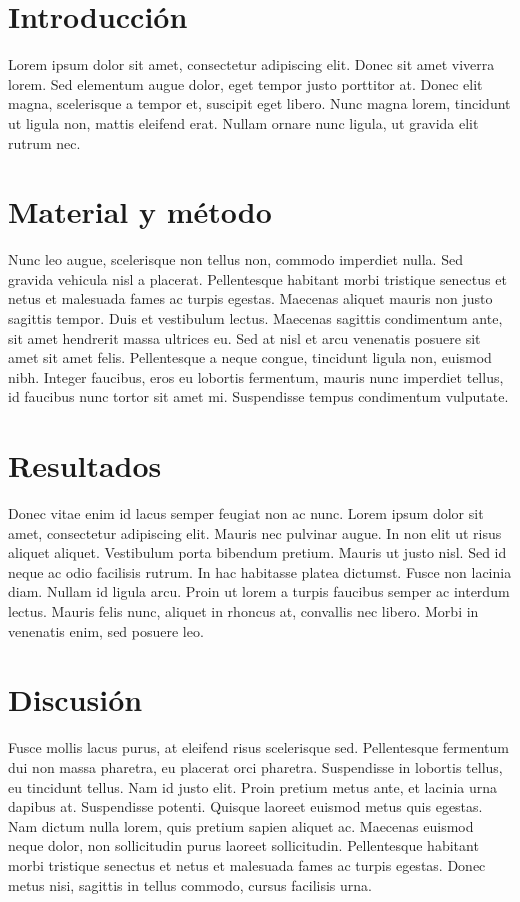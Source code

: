 \documentclass[a4paper, 10pt]{article}
\begin{document}
	\begin{multicols}{2}
		\section{Introducción}
		Lorem ipsum dolor sit amet, consectetur adipiscing elit. Donec sit amet viverra lorem. Sed elementum augue dolor, eget tempor justo porttitor at. Donec elit magna, scelerisque a tempor et, suscipit eget libero. Nunc magna lorem, tincidunt ut ligula non, mattis eleifend erat. Nullam ornare nunc ligula, ut gravida elit rutrum nec. 
		
		\section{Material y método}
		Nunc leo augue, scelerisque non tellus non, commodo imperdiet nulla. Sed gravida vehicula nisl a placerat. Pellentesque habitant morbi tristique senectus et netus et malesuada fames ac turpis egestas. Maecenas aliquet mauris non justo sagittis tempor. Duis et vestibulum lectus. Maecenas sagittis condimentum ante, sit amet hendrerit massa ultrices eu. Sed at nisl et arcu venenatis posuere sit amet sit amet felis. Pellentesque a neque congue, tincidunt ligula non, euismod nibh. Integer faucibus, eros eu lobortis fermentum, mauris nunc imperdiet tellus, id faucibus nunc tortor sit amet mi. Suspendisse tempus condimentum vulputate.
		
		\section{Resultados}
		Donec vitae enim id lacus semper feugiat non ac nunc. Lorem ipsum dolor sit amet, consectetur adipiscing elit. Mauris nec pulvinar augue. In non elit ut risus aliquet aliquet. Vestibulum porta bibendum pretium. Mauris ut justo nisl. Sed id neque ac odio facilisis rutrum. In hac habitasse platea dictumst. Fusce non lacinia diam. Nullam id ligula arcu. Proin ut lorem a turpis faucibus semper ac interdum lectus. Mauris felis nunc, aliquet in rhoncus at, convallis nec libero. Morbi in venenatis enim, sed posuere leo.
		
		\section{Discusión}
		Fusce mollis lacus purus, at eleifend risus scelerisque sed. Pellentesque fermentum dui non massa pharetra, eu placerat orci pharetra. Suspendisse in lobortis tellus, eu tincidunt tellus. Nam id justo elit. Proin pretium metus ante, et lacinia urna dapibus at. Suspendisse potenti. Quisque laoreet euismod metus quis egestas. Nam dictum nulla lorem, quis pretium sapien aliquet ac. Maecenas euismod neque dolor, non sollicitudin purus laoreet sollicitudin. Pellentesque habitant morbi tristique senectus et netus et malesuada fames ac turpis egestas. Donec metus nisi, sagittis in tellus commodo, cursus facilisis urna.
		

\end{multicols}
\end{document}
